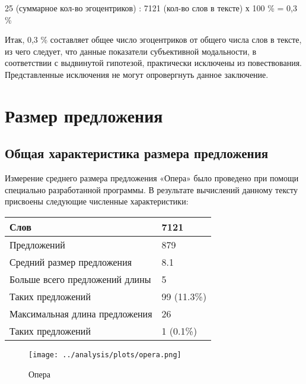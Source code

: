 \documentclass{kursa4}
\begin{document}
{{      {25 (суммарное кол-во эгоцентриков) : 7121 (кол-во слов в тексте) х 100 \% = 0,3 \%}

      Итак, 0,3 \% составляет общее число эгоцентриков от общего числа слов в тексте, из чего следует, что данные показатели субъективной модальности, в соответствии с выдвинутой гипотезой, практически исключены из повествования. Представленные исключения не могут опровергнуть данное заключение.

    \section{Размер предложения}

      \subsection{Общая характеристика размера предложения}

        {Измерение среднего размера предложения «Опера»
        было проведено при помощи специально разработанной программы. В
        результате вычислений данному тексту присвоены следующие численные
        характеристики:}

        \begin{center}     
        \tablehead{} %
        \begin{tabular}{|m{5.767cm}|m{1.8599999cm}|}
          \hline
          Слов &
          7121\\\hline
          Предложений &
          879\\\hline
          Средний размер предложения &
          8.1\\\hline
          Больше всего предложений длины &
          5\\\hline
          Таких предложений &
          99 (11.3\%)\\\hline
          Максимальная длина предложения &
          26\\\hline
          Таких предложений &
          1 (0.1\%)\\\hline
        \end{tabular}
        \end{center} 
        
        \begin{figure}[htbp]
          \centering
          \texttt{[image: ../analysis/plots/opera.png]}
          \caption{Опера}
        \end{figure}
        

}}
\end{document}
